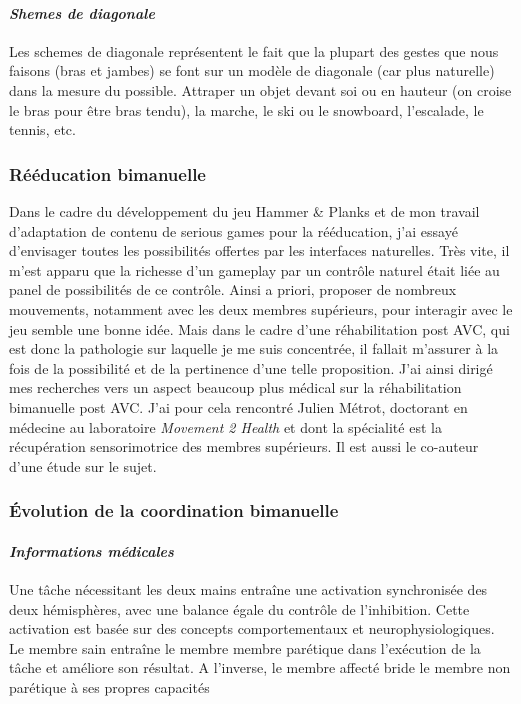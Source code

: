 		\paragraph{\emph{Shemes de diagonale}\\}
Les schemes de diagonale représentent le fait que la plupart des gestes que nous faisons (bras et jambes) se font sur un modèle de diagonale (car plus naturelle) dans la mesure du possible. Attraper un objet devant soi ou en hauteur (on croise le bras pour être bras tendu), la marche, le ski ou le snowboard, l'escalade, le tennis, etc.	
	
	
	\subsubsection{Rééducation bimanuelle} \label{bilateral}
	Dans le cadre du développement du jeu Hammer \& Planks et de mon travail d'adaptation de contenu de serious games pour la rééducation, j'ai essayé d'envisager toutes les possibilités offertes par les interfaces naturelles. Très vite, il m'est apparu que la richesse d'un gameplay par un contrôle naturel était liée au panel de possibilités de ce contrôle. Ainsi a priori, proposer de nombreux mouvements, notamment avec les deux membres supérieurs, pour interagir avec le jeu semble une bonne idée. Mais dans le cadre d'une réhabilitation post AVC, qui est donc la pathologie sur laquelle je me suis concentrée, il fallait m'assurer à la fois de la possibilité et de la pertinence d'une telle proposition. J'ai ainsi dirigé mes recherches vers un aspect beaucoup plus médical sur la réhabilitation bimanuelle post AVC. J'ai pour cela rencontré Julien Métrot, doctorant en médecine au laboratoire \emph{Movement 2 Health} et dont la spécialité est la récupération sensorimotrice des membres supérieurs. Il est aussi le co-auteur d'une étude sur le sujet.
	
		\subsubsection*{Évolution de la coordination bimanuelle}
		
		\paragraph{\emph{Informations médicales}\\}
Une tâche nécessitant les deux mains entraîne une activation synchronisée des deux
hémisphères, avec une balance égale du contrôle de l'inhibition. Cette activation est basée sur des concepts comportementaux et neurophysiologiques.\\
Le membre sain entraîne le membre membre parétique dans l'exécution de la tâche et améliore son
résultat. A l'inverse, le membre affecté bride le membre non parétique à ses propres capacités		
